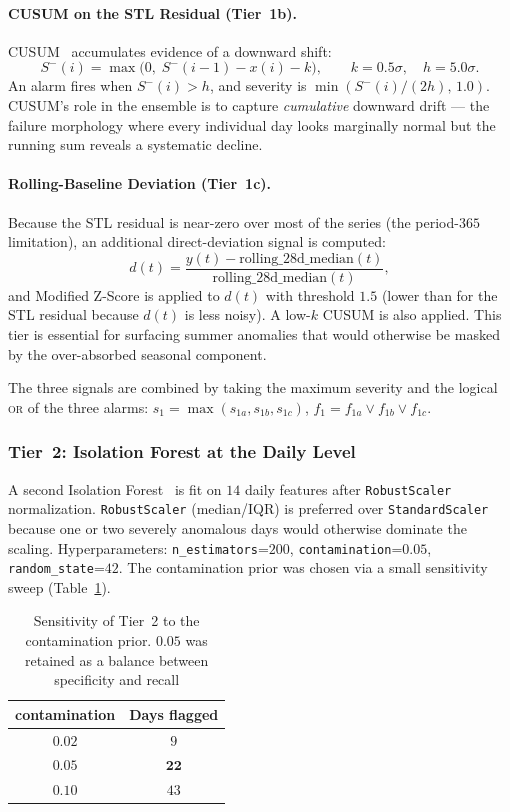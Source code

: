 \documentclass[11pt]{article}
\begin{document}
\paragraph{CUSUM on the STL Residual (Tier~1b).}
CUSUM~\cite{page1954cusum} accumulates evidence of a downward shift:
\[
  S^-(i) = \max\bigl(0,\; S^-(i-1) - x(i) - k\bigr),
  \qquad
  k = 0.5\sigma, \quad h = 5.0\sigma.
\]
An alarm fires when $S^-(i) > h$, and severity is $\min(S^-(i)/(2h),\,1.0)$. CUSUM's role in the ensemble is to capture \emph{cumulative} downward drift --- the failure morphology where every individual day looks marginally normal but the running sum reveals a systematic decline.

\paragraph{Rolling-Baseline Deviation (Tier~1c).}
Because the STL residual is near-zero over most of the series (the period-$365$ limitation), an additional direct-deviation signal is computed:
\[
  d(t) = \frac{y(t) - \mathrm{rolling\_28d\_median}(t)}{\mathrm{rolling\_28d\_median}(t)},
\]
and Modified Z-Score is applied to $d(t)$ with threshold $1.5$ (lower than for the STL residual because $d(t)$ is less noisy). A low-$k$ CUSUM is also applied. This tier is essential for surfacing summer anomalies that would otherwise be masked by the over-absorbed seasonal component.

The three signals are combined by taking the maximum severity and the logical \textsc{or} of the three alarms:
$s_1 = \max(s_{1a}, s_{1b}, s_{1c})$,
$f_1 = f_{1a} \vee f_{1b} \vee f_{1c}$.

\subsubsection*{Tier~2: Isolation Forest at the Daily Level}
A second Isolation Forest~\cite{liu2008isolation} is fit on $14$ daily features after \texttt{RobustScaler} normalization. \texttt{RobustScaler} (median/IQR) is preferred over \texttt{StandardScaler} because one or two severely anomalous days would otherwise dominate the scaling. Hyperparameters: \texttt{n\_estimators}=$200$, \texttt{contamination}=$0.05$, \texttt{random\_state}=$42$. The contamination prior was chosen via a small sensitivity sweep (Table~\ref{tab:contam_sweep}).

\begin{table}[H]
\centering
\caption{Sensitivity of Tier~2 to the contamination prior. $0.05$ was retained as a balance between specificity and recall}
\label{tab:contam_sweep}
\begin{tabular}{cc}
\toprule
\textbf{contamination} & \textbf{Days flagged}\\
\midrule
$0.02$ & $9$\\
$\mathbf{0.05}$ & $\mathbf{22}$\\
$0.10$ & $43$\\
\bottomrule
\end{tabular}
\end{table}
\end{document}
